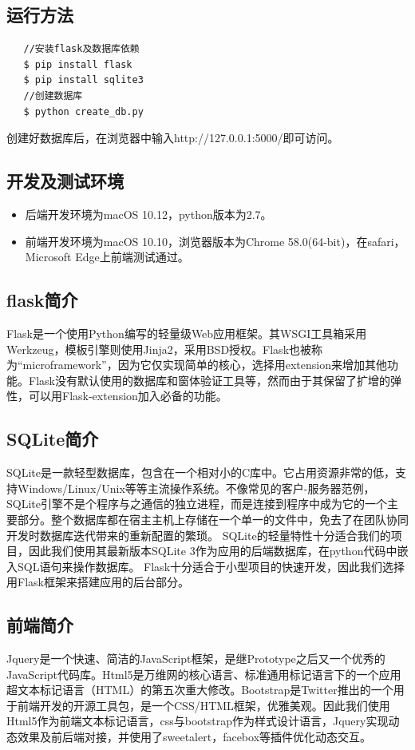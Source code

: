 \documentclass[12pt, oneside,a4paper]{article}
\begin{document}
\subsection{运行方法}
\begin{lstlisting}
   //安装flask及数据库依赖
   $ pip install flask   
   $ pip install sqlite3
   //创建数据库
   $ python create_db.py
   \end{lstlisting}
创建好数据库后，在浏览器中输入http://127.0.0.1:5000/即可访问。
\subsection{开发及测试环境}
\begin{itemize}
\item 后端开发环境为macOS 10.12，python版本为2.7。
\item 前端开发环境为macOS 10.10，浏览器版本为Chrome 58.0(64-bit)，在safari，Microsoft Edge上前端测试通过。
\end{itemize}
\subsection{flask简介}
Flask是一个使用Python编写的轻量级Web应用框架。其WSGI工具箱采用Werkzeug，模板引擎则使用Jinja2，采用BSD授权。Flask也被称为“microframework”，因为它仅实现简单的核心，选择用extension来增加其他功能。Flask没有默认使用的数据库和窗体验证工具等，然而由于其保留了扩增的弹性，可以用Flask-extension加入必备的功能。
\subsection{SQLite简介}
SQLite是一款轻型数据库，包含在一个相对小的C库中。它占用资源非常的低，支持Windows/Linux/Unix等等主流操作系统。不像常见的客户-服务器范例，SQLite引擎不是个程序与之通信的独立进程，而是连接到程序中成为它的一个主要部分。整个数据库都在宿主主机上存储在一个单一的文件中，免去了在团队协同开发时数据库迭代带来的重新配置的繁琐。
SQLite的轻量特性十分适合我们的项目，因此我们使用其最新版本SQLite 3作为应用的后端数据库，在python代码中嵌入SQL语句来操作数据库。
Flask十分适合于小型项目的快速开发，因此我们选择用Flask框架来搭建应用的后台部分。
\subsection{前端简介}
Jquery是一个快速、简洁的JavaScript框架，是继Prototype之后又一个优秀的JavaScript代码库。Html5是万维网的核心语言、标准通用标记语言下的一个应用超文本标记语言（HTML）的第五次重大修改。Bootstrap是Twitter推出的一个用于前端开发的开源工具包，是一个CSS/HTML框架，优雅美观。因此我们使用Html5作为前端文本标记语言，css与bootstrap作为样式设计语言，Jquery实现动态效果及前后端对接，并使用了sweetalert，facebox等插件优化动态交互。
\end{document}
